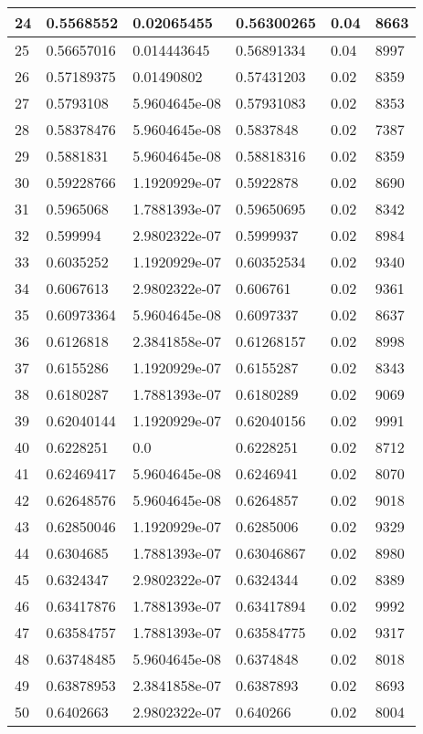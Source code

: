 \begin{longtable}{|l|l|l|l|l|l|}
24 & 0.5568552 & 0.02065455 & 0.56300265 & 0.04 & 8663 \\ \hline 
25 & 0.56657016 & 0.014443645 & 0.56891334 & 0.04 & 8997 \\ \hline 
26 & 0.57189375 & 0.01490802 & 0.57431203 & 0.02 & 8359 \\ \hline 
27 & 0.5793108 & 5.9604645e-08 & 0.57931083 & 0.02 & 8353 \\ \hline 
28 & 0.58378476 & 5.9604645e-08 & 0.5837848 & 0.02 & 7387 \\ \hline 
29 & 0.5881831 & 5.9604645e-08 & 0.58818316 & 0.02 & 8359 \\ \hline 
30 & 0.59228766 & 1.1920929e-07 & 0.5922878 & 0.02 & 8690 \\ \hline 
31 & 0.5965068 & 1.7881393e-07 & 0.59650695 & 0.02 & 8342 \\ \hline 
32 & 0.599994 & 2.9802322e-07 & 0.5999937 & 0.02 & 8984 \\ \hline 
33 & 0.6035252 & 1.1920929e-07 & 0.60352534 & 0.02 & 9340 \\ \hline 
34 & 0.6067613 & 2.9802322e-07 & 0.606761 & 0.02 & 9361 \\ \hline 
35 & 0.60973364 & 5.9604645e-08 & 0.6097337 & 0.02 & 8637 \\ \hline 
36 & 0.6126818 & 2.3841858e-07 & 0.61268157 & 0.02 & 8998 \\ \hline 
37 & 0.6155286 & 1.1920929e-07 & 0.6155287 & 0.02 & 8343 \\ \hline 
38 & 0.6180287 & 1.7881393e-07 & 0.6180289 & 0.02 & 9069 \\ \hline 
39 & 0.62040144 & 1.1920929e-07 & 0.62040156 & 0.02 & 9991 \\ \hline 
40 & 0.6228251 & 0.0 & 0.6228251 & 0.02 & 8712 \\ \hline 
41 & 0.62469417 & 5.9604645e-08 & 0.6246941 & 0.02 & 8070 \\ \hline 
42 & 0.62648576 & 5.9604645e-08 & 0.6264857 & 0.02 & 9018 \\ \hline 
43 & 0.62850046 & 1.1920929e-07 & 0.6285006 & 0.02 & 9329 \\ \hline 
44 & 0.6304685 & 1.7881393e-07 & 0.63046867 & 0.02 & 8980 \\ \hline 
45 & 0.6324347 & 2.9802322e-07 & 0.6324344 & 0.02 & 8389 \\ \hline 
46 & 0.63417876 & 1.7881393e-07 & 0.63417894 & 0.02 & 9992 \\ \hline 
47 & 0.63584757 & 1.7881393e-07 & 0.63584775 & 0.02 & 9317 \\ \hline 
48 & 0.63748485 & 5.9604645e-08 & 0.6374848 & 0.02 & 8018 \\ \hline 
49 & 0.63878953 & 2.3841858e-07 & 0.6387893 & 0.02 & 8693 \\ \hline 
50 & 0.6402663 & 2.9802322e-07 & 0.640266 & 0.02 & 8004 \\ \hline 
\end{longtable}